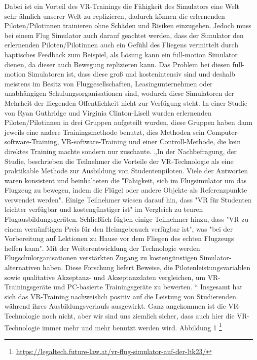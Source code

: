 Dabei ist ein Vorteil des VR-Trainings die Fähigkeit des Simulators eine Welt sehr ähnlich unserer Welt zu replizieren, dadurch können die erlernenden Piloten/Pilotinnen trainieren ohne Schäden und Risiken einzugehen. Jedoch muss bei einem Flug Simulator auch darauf geachtet werden, dass der Simulator den erlernenden Piloten/Pilotinnen auch ein Gefühl des Fliegens vermittelt durch haptisches Feedback zum Beispiel, als Lösung kann ein full-motion Simulator dienen, da dieser auch Bewegung replizieren kann. Das Problem bei diesen full-motion Simulatoren ist, dass diese groß und kostenintensiv sind und deshalb meistens im Besitz von Fluggesellschaften, Leasingunternehmen oder unabhängigen Schulungsorganisationen sind, wodurch diese Simulatoren der Mehrheit der fliegenden Öffentlichkeit nicht zur Verfügung steht. In einer Studie von Ryan Guthridge und Virginia Clinton-Lisell wurden erlernenden Piloten/Pilotinnen in drei Gruppen aufgeteilt wurden, diese Gruppen haben dann jeweils eine andere Trainingsmethode benutzt, dies Methoden sein Computer-software-Training, VR-software-Training und einer Controll-Methode, die kein direktes Training machte sondern nur zuschaute. „In der Nachbefragung, der Studie, beschrieben die Teilnehmer die Vorteile der VR-Technologie als eine praktikable Methode zur Ausbildung von Studentenpiloten. Viele der Antworten waren konsistent und beinhalteten die "Fähigkeit, sich im Flugsimulator um das Flugzeug zu bewegen, indem die Flügel oder andere Objekte als Referenzpunkte verwendet werden". Einige Teilnehmer wiesen darauf hin, dass "VR für Studenten leichter verfügbar und kostengünstiger ist" im Vergleich zu teuren Flugausbildungsgeräten. Schließlich fügten einige Teilnehmer hinzu, dass "VR zu einem vernünftigen Preis für den Heimgebrauch verfügbar ist", was "bei der Vorbereitung auf Lektionen zu Hause vor dem Fliegen des echten Flugzeugs helfen kann". Mit der Weiterentwicklung der Technologie werden Flugschulorganisationen verstärkten Zugang zu kostengünstigen Simulator-alternativen haben. Diese Forschung liefert Beweise, die Pilotenleistungsvariablen sowie qualitative Akzeptanz- und Akzeptanzdaten vergleichen, um VR-Trainingsgeräte und PC-basierte Trainingsgeräte zu bewerten. \cite{guthridge2023evaluating}“ 
Insgesamt hat sich das VR-Training nachweislich positiv auf die Leistung von Studierenden während ihres Ausbildungsverlaufs ausgewirkt. Ganz angekommen ist die VR-Technologie noch nicht, aber wir sind uns ziemlich sicher, dass auch hier die VR-Technologie immer mehr und mehr benutzt werden wird.
Abbildung 1 \footnote{\url{https://legaltech.future-law.at/vr-flug-simulator-auf-der-ltk23/}}
